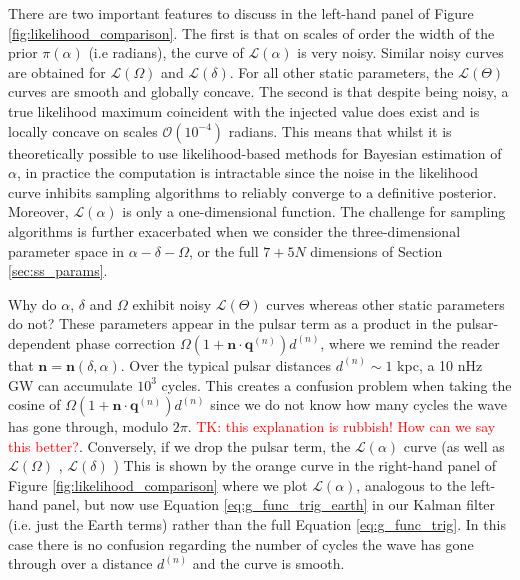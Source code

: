 \documentclass[fleqn,usenatbib,useAMS]{mnras}
\begin{document}
There are two important features to discuss in the left-hand panel of Figure \ref{fig:likelihood_comparison}. The first is that on scales of order the width of the prior $\pi(\alpha)$ (i.e radians), the curve of $\mathcal{L}(\alpha)$ is very noisy. Similar noisy curves are obtained for $\mathcal{L}(\Omega)$ and $\mathcal{L}(\delta)$. For all other static parameters, the $\mathcal{L}(\Theta)$ curves are smooth and globally concave. The second is that despite being noisy, a true likelihood maximum coincident with the injected value does exist and is locally concave on scales $\mathcal{O} \left( 10^{-4}\right)$ radians. This means that whilst it is theoretically possible to use likelihood-based methods for Bayesian estimation of $\alpha$, in practice the computation is intractable since the noise in the likelihood curve inhibits sampling algorithms to reliably converge to a definitive posterior. Moreover, $\mathcal{L}(\alpha)$ is only a one-dimensional function. The challenge for sampling algorithms is further exacerbated when we consider the three-dimensional parameter space in $\alpha - \delta - \Omega$, or the full $7 + 5N$ dimensions of Section \ref{sec:ss_params}. \newline 

Why do $\alpha$, $\delta$ and $\Omega$ exhibit noisy $\mathcal{L}(\Theta)$ curves whereas other static parameters do not? These parameters appear in the pulsar term as a product in the pulsar-dependent phase correction $\Omega \left(1 + \boldsymbol{n}\cdot \boldsymbol{q}^{(n)} \right)  d^{(n)}$, where we remind the reader that $\boldsymbol{n} = \boldsymbol{n}(\delta, \alpha)$. Over the typical pulsar distances $d^{(n)} \sim 1$ kpc, a 10 nHz GW can accumulate $10^3$ cycles. This creates a confusion problem when taking the cosine of  $\Omega \left(1 + \boldsymbol{n}\cdot \boldsymbol{q}^{(n)} \right)  d^{(n)}$ since we do not know how many cycles the wave has gone through, modulo $2 \pi$. \textcolor{red}{TK: this explanation is rubbish! How can we say this better?}. Conversely, if we drop the pulsar term,  the $\mathcal{L}(\alpha)$ curve (as well as $\mathcal{L}(\Omega)$ , $\mathcal{L}(\delta)$   )
This is shown by the orange curve in the right-hand panel of Figure \ref{fig:likelihood_comparison} where we plot $\mathcal{L}(\alpha)$, analogous to the left-hand panel, but now use Equation \ref{eq:g_func_trig_earth} in our Kalman filter (i.e. just the Earth terms) rather than the full Equation \ref{eq:g_func_trig}. In this case there is no confusion regarding the number of cycles the wave has gone through over a distance $d^{(n)}$ and the curve is smooth.
\end{document}
